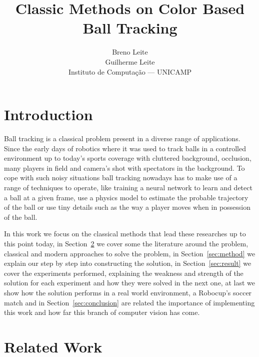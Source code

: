 \documentclass[10pt,twocolumn,letterpaper]{article}
\begin{document}
\title{Classic Methods on Color Based Ball Tracking}

\author{Breno Leite\\ Guilherme Leite\\
Instituto de Computa\c{c}\~ao --- UNICAMP\\
}

\maketitle

\section{Introduction}\label{sec:intro}

Ball tracking is a classical problem present in a diverse range of
applications. Since the early days of robotics where it was used to track
balls in a controlled environment up to today's sports coverage with cluttered
background, occlusion, many players in field and camera's shot with spectators
in the background. To cope with such noisy situations ball tracking nowadays
has to make use of a range of techniques to operate, like training a neural
network to learn and detect a ball at a given frame, use a physics model to
estimate the probable trajectory of the ball or use tiny details such as the
way a player moves when in possession of the ball.

In this work we focus on the classical methods that lead these researches up
to this point today, in Section~\ref{sec:work} we cover some the literature
around the problem, classical and modern approaches to solve the problem, in
Section~\ref{sec:method} we explain our step by step into constructing the
solution, in Section~\ref{sec:result} we cover the experiments performed,
explaining the weakness and strength of the solution for each experiment and
how they were solved in the next one, at last we show how the solution
performs in a real world environment, a Robocup's soccer match and in
Section~\ref{sec:conclusion} are related the importance of implementing this
work and how far this branch of computer vision has come.


\section{Related Work}\label{sec:work}
\end{document}
